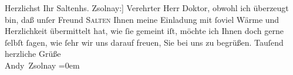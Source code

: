\begin{ledgroupsized}[t]{13cm}
           \pstart Herzlichst Ihr \spacefill\mbox{Salten}\pend{}{\bigskip}\pstart{}{[}hs. Zsolnay:{]} Verehrter Herr Doktor,\pend\pstart
           obwohl ich überzeugt bin, daß unſer Freund \textsc{Salten} Ihnen
               meine Einladung mit ſoviel Wärme und Herzlichkeit übermittelt hat, wie ſie gemeint
               iſt, möchte ich Ihnen doch gerne ſelbſt ſagen, wie ſehr {\pb}wir uns darauf freuen, Sie bei
               uns zu begrüßen.\pend
           \pstart
           Tauſend herzliche Grüße {\\[\baselineskip]}\spacefill\mbox{Andy Zsolnay}\pend
           \leftskip=0em{}
         
         \endnumbering{}\end{ledgroupsized}  \newcommand{\dateiname}{L02793}\newcommand{\titel}{Felix Salten an Arthur Schnitzler, 15. 6. 1923}\newcommand{\editorInnen}{Martin Anton Müller und Laura Untner}
      